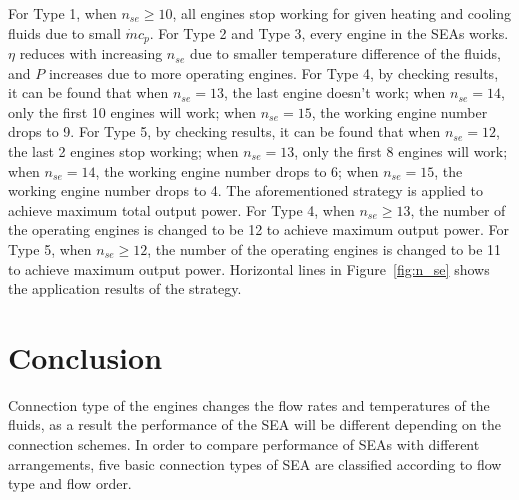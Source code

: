 For Type 1, when $n_{se} \geqslant 10$, all engines stop working for given heating and cooling fluids due to small $\dot{m}c_p$. For Type 2 and Type 3, every engine in the SEAs works. $\eta$ reduces with increasing $n_{se}$ due to smaller temperature difference of the fluids, and $P$ increases due to more operating engines. For Type 4, by checking results, it can be found that when $n_{se} = 13$,  the last engine doesn't work; when $n_{se} = 14$, only the first 10 engines will work; when $n_{se} = 15$, the working engine number drops to 9. For Type 5, by checking results, it can be found that when $n_{se} = 12$, the last 2 engines stop working; when $n_{se} = 13$, only the first 8 engines will work; when $n_{se} = 14$, the working engine number drops to 6; when $n_{se} = 15$, the working engine number drops to 4. The aforementioned strategy is applied to achieve maximum total output power. For Type 4, when $n_{se} \geqslant 13$, the number of the operating engines is changed to be 12 to achieve maximum output power. For Type 5, when $n_{se} \geqslant 12$, the number of the operating engines is changed to be 11 to achieve maximum output power.
Horizontal lines in Figure~\ref{fig:n_se} shows the application results of the strategy. 

\section{Conclusion}

Connection type of the engines changes the flow rates and temperatures of the fluids, as a result the performance of the SEA will be different depending on the connection schemes. In order to compare performance of SEAs with different arrangements, five basic connection types of SEA are classified according to flow type and flow order. 


